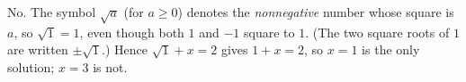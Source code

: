 No. The symbol $\sqrt{a}$ (for $a\ge0$) denotes the \emph{nonnegative} number whose square is $a$, so $\sqrt1=1$, even though both $1$ and $-1$ square to $1$. (The two square roots of $1$ are written $\pm\sqrt1$.) Hence $\sqrt1+x=2$ gives $1+x=2$, so $x=\boxed{1}$ is the only solution; $x=3$ is not.
